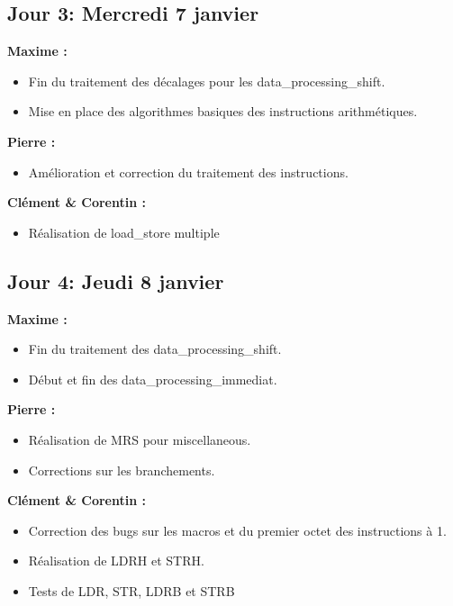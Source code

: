\documentclass[11pt]{article} %
\begin{document}
\subsection{Jour 3: Mercredi 7 janvier}
\textbf{Maxime :}
\begin{itemize}
  \item Fin du traitement des d\'ecalages pour les data\_processing\_shift.
  \item Mise en place des algorithmes basiques des instructions arithm\'etiques.
\end{itemize}
\textbf{Pierre :}
\begin{itemize}
  \item Am\'elioration et correction du traitement des instructions.
\end{itemize}
\textbf{Cl\'ement \& Corentin :}
\begin{itemize}
  \item R\'ealisation de load\_store multiple
\end{itemize}

\subsection{Jour 4: Jeudi 8 janvier}
\textbf{Maxime :}
\begin{itemize}
  \item Fin du traitement des data\_processing\_shift.
  \item Début et fin des data\_processing\_immediat.
\end{itemize}
\textbf{Pierre :}
\begin{itemize}
  \item R\'ealisation de MRS pour miscellaneous.
  \item Corrections sur les branchements.
\end{itemize}
\textbf{Cl\'ement \& Corentin :}
\begin{itemize}
  \item Correction des bugs sur les macros et du premier octet des instructions \`a 1.
  \item R\'ealisation de LDRH et STRH.
  \item Tests de LDR, STR, LDRB et STRB
\end{itemize}
\end{document}
